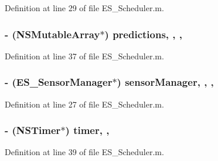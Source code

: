 Definition at line 29 of file E\+S\+\_\+\+Scheduler.\+m.

\hypertarget{category_e_s___scheduler_07_08_a3ade2070171412aa851e3628a09c7863}{
\subsubsection[{predictions}]{\setlength{\rightskip}{0pt plus 5cm}-\/ (N\+S\+Mutable\+Array$\ast$) predictions\hspace{0.3cm}{\ttfamily [read]}, {\ttfamily [write]}, {\ttfamily [nonatomic]}, {\ttfamily [strong]}}}\label{category_e_s___scheduler_07_08_a3ade2070171412aa851e3628a09c7863}


Definition at line 37 of file E\+S\+\_\+\+Scheduler.\+m.

\hypertarget{category_e_s___scheduler_07_08_a69f8cef7fe4de84d48f2ce16e966d81b}{
\subsubsection[{sensor\+Manager}]{\setlength{\rightskip}{0pt plus 5cm}-\/ ({\bf E\+S\+\_\+\+Sensor\+Manager}$\ast$) sensor\+Manager\hspace{0.3cm}{\ttfamily [read]}, {\ttfamily [write]}, {\ttfamily [nonatomic]}, {\ttfamily [strong]}}}\label{category_e_s___scheduler_07_08_a69f8cef7fe4de84d48f2ce16e966d81b}


Definition at line 27 of file E\+S\+\_\+\+Scheduler.\+m.

\hypertarget{category_e_s___scheduler_07_08_ab57b08f10d38f20c8d4a15bffe23e001}{
\subsubsection[{timer}]{\setlength{\rightskip}{0pt plus 5cm}-\/ (N\+S\+Timer$\ast$) timer\hspace{0.3cm}{\ttfamily [read]}, {\ttfamily [write]}, {\ttfamily [atomic]}}}\label{category_e_s___scheduler_07_08_ab57b08f10d38f20c8d4a15bffe23e001}


Definition at line 39 of file E\+S\+\_\+\+Scheduler.\+m.


